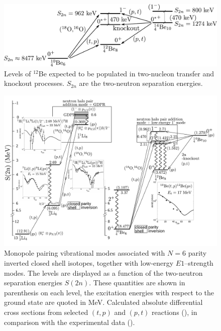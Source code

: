 \begin{subappendices}
\begin{figure}
\includegraphics[width=\textwidth]{C8/figsC8/figa4_newnew.pdf}
\caption{Levels of $^{12}$Be expected to be populated in two-nucleon transfer and knockout processes. $S_{2n}$ are the two-neutron separation energies.}\label{fig6.I.4}
\end{figure}


\begin{figure}
	\begin{center}
\includegraphics[angle=0,width=1.2\textwidth]{C8/figsC8/fig1_varenna.pdf}
\caption{ Monopole pairing vibrational modes associated with 
$N=6$ parity inverted closed shell isotopes, together with low-energy $E1$--strength modes. 
The levels are  displayed as a function of the two-neutron separation energies $S(2n)$. 
These quantities are shown in parenthesis on each level, the excitation energies with respect to the ground state are quoted in MeV. Calculated
absolute differential cross sections from selected $(t,p)$ and $(p,t)$ reactions (\cite{Potel:10,Potel:14,Broglia:16}),
in comparison with the experimental data (\cite{Young:71,Fortune:94,Tanihata:08,AjzenbergSelove:78}).}\label{fig6.I.5}
\end{center}
\end{figure}


\end{subappendices}

